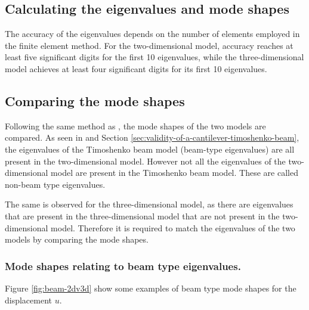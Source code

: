 \begin{figure}[h!]
{{\begin{minipage}[b]{0.7\linewidth}
				
			\end{minipage}
		}
	}
\end{figure}
\FloatBarrier

\subsection*{Calculating the eigenvalues and mode shapes}
 The accuracy of the eigenvalues depends on the number of elements employed in the finite element method. For the two-dimensional model, accuracy reaches at least five significant digits for the first 10 eigenvalues, while the three-dimensional model achieves at least four significant digits for its first 10 eigenvalues.

\subsection*{Comparing the mode shapes}
Following the same method as \cite{LVV09}, the mode shapes of the two models are compared. As seen in \cite{LVV09} and Section \ref{sec:validity-of-a-cantilever-timoshenko-beam}, the eigenvalues of the Timoshenko beam model (beam-type eigenvalues) are all present in the two-dimensional model. However not all the eigenvalues of the two-dimensional model are present in the Timoshenko beam model. These are called non-beam type eigenvalues. 

The same is observed for the three-dimensional model, as there are eigenvalues that are present in the three-dimensional model that are not present in the two-dimensional model. Therefore it is required to match the eigenvalues of the two models by comparing the mode shapes.

\subsubsection*{Mode shapes relating to beam type eigenvalues.}
Figure \ref{fig:beam-2dv3d} show some examples of beam type mode shapes for the displacement $u$.

